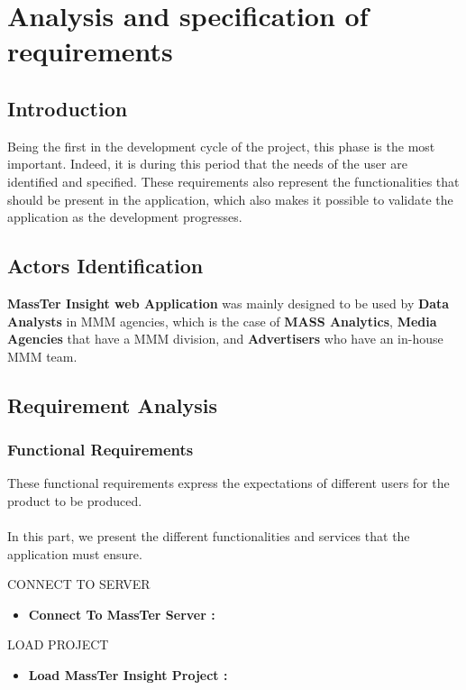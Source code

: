 

	\chapter{Analysis and specification of requirements}

	
	\section{Introduction}
	Being the first in the development cycle of the project, this phase is the most
	important. Indeed, it is during this period that the needs of the user are identified and specified. These requirements also represent the functionalities that should be present in the application, which also makes it possible to validate the application as the development progresses.
	\section{Actors Identification}
	\textbf{MassTer Insight web Application }was mainly designed to be used by \textbf{Data Analysts }in MMM agencies, which is the case of \textbf{MASS Analytics}, \textbf{Media Agencies }that have a MMM division, and \textbf{Advertisers }who have an in-house MMM team.
	
	\clearpage
	\newpage
	
	
	\section{Requirement Analysis}

	\subsection{Functional Requirements}
     
	These functional requirements express the expectations of different users for the product to be produced.
	\\
	\\
	In this part, we present the different functionalities and services that the application must ensure.
	
	CONNECT TO SERVER
	\begin{itemize}
		\setlength{\itemindent}{+.5in}
		\item \textbf{Connect To MassTer Server : } 
	\end{itemize}
	
	LOAD PROJECT
	\begin{itemize}
		\setlength{\itemindent}{+.5in}
     	\item \textbf{Load MassTer Insight Project : } 
    \end{itemize}

